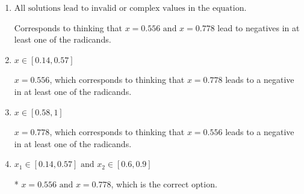 \documentclass{extbook}[14pt]
\begin{document}
\begin{enumerate}
{\begin{enumerate}[label=\Alph*.]
$x = -0.778 \text{ and } x = -0.556$, which are the negative or absolute values of the values you would have gotten by solving the equation correctly.
\item \( \text{All solutions lead to invalid or complex values in the equation.} \)

Corresponds to thinking that $x = 0.556 \text{ and } x = 0.778$ lead to negatives in at least one of the radicands.
\item \( x \in [0.14,0.57] \)

$x = 0.556$, which corresponds to thinking that $x = 0.778$ leads to a negative in at least one of the radicands.
\item \( x \in [0.58,1] \)

$x = 0.778$, which corresponds to thinking that $x = 0.556$ leads to a negative in at least one of the radicands.
\item \( x_1 \in [0.14, 0.57] \text{ and } x_2 \in [0.6,0.9] \)

* $x = 0.556 \text{ and } x = 0.778$, which is the correct option.
\end{enumerate}

}
\end{enumerate}
\end{document}
